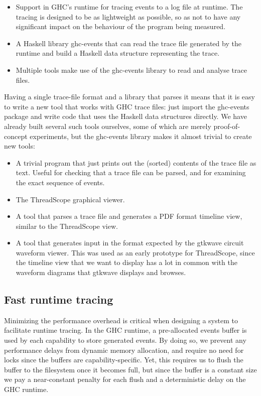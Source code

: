 \documentclass[twocolumn,9pt]{sigplanconf}
\newcommand{\codef}[1]{{\fontfamily{cmss}\small#1}}
\begin{document}
\begin{itemize}
\item Support in GHC's runtime for tracing events to a log file at
  runtime.  The tracing is designed to be as lightweight as possible,
  so as not to have any significant impact on the behaviour of the
  program being measured.

\item A Haskell library \codef{ghc-events} that can read the trace file
  generated by the runtime and build a Haskell data structure
  representing the trace.

\item Multiple tools make use of the \codef{ghc-events} library to read and
  analyse trace files.
\end{itemize}

Having a single trace-file format and a library that parses it means
that it is easy to write a new tool that works with GHC trace files:
just import the \codef{ghc-events} package and write code that uses the
Haskell data structures directly.  We have already built several such
tools ourselves, some of which are merely proof-of-concept
experiments, but the \codef{ghc-events} library makes it almost trivial to
create new tools:

\begin{itemize}
\item A trivial program that just prints out the (sorted) contents of
  the trace file as text.  Useful for checking that a trace file can
  be parsed, and for examining the exact sequence of events.

\item The ThreadScope graphical viewer.

\item A tool that parses a trace file and generates a PDF format
  timeline view, similar to the ThreadScope view.

\item A tool that generates input in the format expected by the
  gtkwave circuit waveform viewer.  This was used as an early
  prototype for ThreadScope, since the timeline view that we want to
  display has a lot in common with the waveform diagrams that gtkwave
  displays and browses.
\end{itemize}

\subsection{Fast runtime tracing}
Minimizing the performance overhead is critical when designing a system
to facilitate runtime tracing.  In the GHC runtime, a pre-allocated events buffer is 
used by each capability to store generated events.
By doing so, we prevent any performance delays from dynamic 
memory allocation, and require no need for locks since the buffers are
capability-specific.  Yet, this requires us to flush the buffer
to the filesystem once it becomes full, but since the buffer is a
constant size we pay a near-constant penalty for each flush and a
deterministic delay on the GHC runtime.
\end{document}
